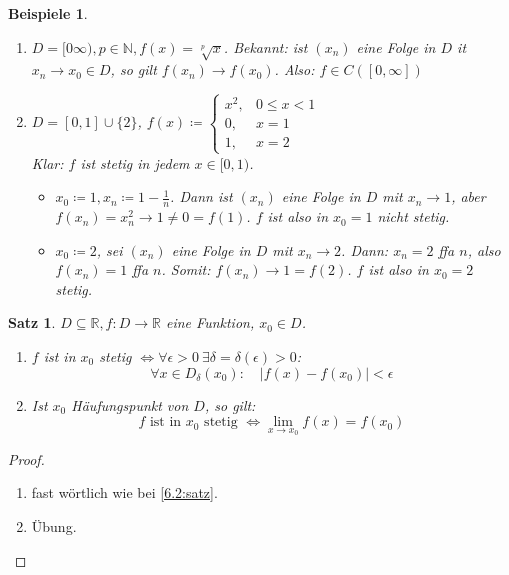 \documentclass[14pt,titlepage,ngerman,a4paper,headsepline,DIV15,halfparskip*]{scrartcl}
\newcommand{\N}{\mathbb{N}}
\newcommand{\R}{\mathbb{R}}
\theoremstyle{named}
\theoremstyle{dotless}
\newtheorem{satz}[namedtheorem]{Satz}
\newtheorem*{beispiele}{Beispiele}
\begin{document}
\begin{beispiele}
	\begin{enumerate}
		\item $D = [0 \infty), p \in \N, f(x) = \sqrt[p]{x}$. Bekannt: ist $(x_{n})$ eine Folge in $D$ it $x_{n} \rightarrow x_{0} \in D$, so gilt $f(x_{n}) \rightarrow f(x_{0})$. Also: $f \in C\left([0, \infty]\right)$
		\item $D = [0, 1] \cup \{ 2 \}$, $ f(x) \coloneqq \begin{cases}
				x^{2}, & 0 \leq x < 1 \\ 0, & x = 1 \\ 1, & x = 2
			\end{cases}$ \\
			Klar: $f$ ist stetig in jedem $x \in [0, 1)$. 
			\begin{itemize}
				\item $x_{0} \coloneqq 1, x_{n} \coloneqq 1 - \frac{1}{n}$. Dann ist $(x_{n})$ eine Folge in $D$ mit $x_{n} \rightarrow 1$, aber $f(x_{n}) = x_{n}^{2} \rightarrow 1 \neq 0 = f(1)$. $f$ ist also in $x_{0} = 1$ nicht stetig.
				\item $x_{0} \coloneqq 2$, sei $(x_{n})$ eine Folge in $D$ mit $x_{n} \rightarrow 2$. Dann: $x_{n} = 2$ ffa $n$, also $f(x_{n}) = 1$ ffa $n$. Somit: $f(x_{n}) \rightarrow 1 = f(2)$. $f$ ist also in $x_{0} = 2$ stetig.
			\end{itemize}	
	\end{enumerate}	
\end{beispiele}


\begin{satz} \label{7.1:satz}
	$D \subseteq \R, f \colon D \rightarrow \R$ eine Funktion, $x_{0} \in D$.
	\begin{enumerate}
		\item $f$ ist in $x_{0}$ stetig $\iff \forall \epsilon > 0 ~\exists \delta = \delta(\epsilon) > 0$:
			$$ \forall x\in D_{\delta}(x_{0}): \quad |f(x) - f(x_{0})| < \epsilon $$
		\item Ist $x_{0}$ Häufungspunkt von $D$, so gilt:
			$$ f \text{ ist in } x_{0} \text{ stetig } \iff \lim_{x \rightarrow x_{0}} f(x) = f(x_{0}) $$
	\end{enumerate}
\end{satz}

\begin{proof} \
	\begin{enumerate}
		\item fast wörtlich wie bei \ref{6.2:satz}.
		\item Übung.
	\end{enumerate}
\end{proof}
\end{document}
